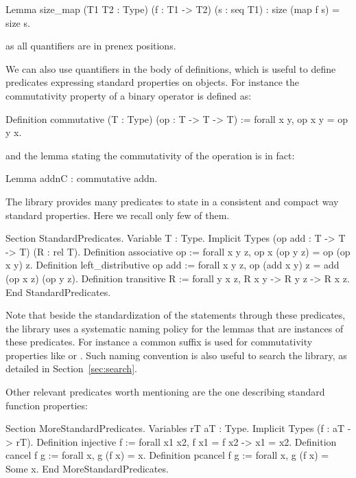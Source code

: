 \begin{coq}{}{}
Lemma size_map (T1 T2 : Type) (f : T1 -> T2) (s : seq T1) :
 size (map f s) = size s.
\end{coq}
as all quantifiers are in prenex positions.

We can also use quantifiers in the body of definitions, which is
useful to define predicates expressing standard properties on
objects. For instance the commutativity property of a binary operator
is defined as:

\begin{coq}{}{}
Definition commutative (T : Type) (op : T -> T -> T) :=
  forall x y, op x y = op y x.
\end{coq}
and the lemma stating the commutativity of the  operation is
in fact:

\begin{coq}{}{}
Lemma addnC : commutative addn.
\end{coq}
The \mcbMC{} library provides many predicates to state in a consistent
and compact way standard properties.  Here we recall only few of them.

\begin{coq}{}{}
Section StandardPredicates.
Variable T : Type.
Implicit Types (op add : T -> T -> T) (R : rel T).
Definition associative op := forall x y z, op x (op y z) = op (op x y) z.
Definition left_distributive op add :=
  forall x y z, op (add x y) z = add (op x z) (op y z).
Definition transitive R := forall y x z, R x y -> R y z -> R x z.
End StandardPredicates.
\end{coq}

Note that beside the standardization of the statements through these
predicates, the \mcbMC{} library uses a systematic naming policy for the lemmas
that are instances of these predicates. For instance a common suffix  is
used for commutativity properties like  or .
Such naming convention is also useful to search the library, as detailed
in Section~\ref{sec:search}.

Other relevant predicates worth mentioning are the one describing standard
function properties:

\begin{coq}{}{}
Section MoreStandardPredicates.
Variables rT aT : Type.
Implicit Types (f : aT -> rT).
Definition injective f := forall x1 x2, f x1 = f x2 -> x1 = x2.
Definition cancel f g := forall x, g (f x) = x.
Definition pcancel f g := forall x, g (f x) = Some x.
End MoreStandardPredicates.
\end{coq}

